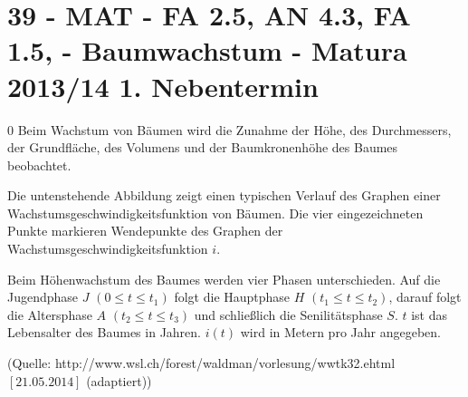 \section{39 - MAT - FA 2.5, AN 4.3, FA 1.5,  - Baumwachstum - Matura 2013/14 1. Nebentermin}

\begin{langesbeispiel} \item[0] %
				Beim Wachstum von Bäumen wird die Zunahme der Höhe, des Durchmessers, der Grundfläche, des Volumens und der Baumkronenhöhe des Baumes beobachtet. 
				
				Die untenstehende Abbildung zeigt einen typischen Verlauf des Graphen einer Wachstumsgeschwindigkeitsfunktion von Bäumen. Die vier eingezeichneten Punkte markieren Wendepunkte des Graphen der Wachstumsgeschwindigkeitsfunktion $i$. 
				
				Beim Höhenwachstum des Baumes werden vier Phasen unterschieden. Auf die Jugendphase $J\,\,(0\leq t \leq t_1)$ folgt die Hauptphase $H\,\,(t_1\leq t\leq t_2)$, darauf folgt die Altersphase $A\,\,(t_2\leq t\leq t_3)$ und schließlich die Senilitätsphase $S$. $t$ ist das Lebensalter des Baumes in Jahren. $i(t)$ wird in Metern pro Jahr angegeben.

				\begin{center}\end{center}
				
				\begin{singlespace}
\begin{tiny}
(Quelle: http://www.wsl.ch/forest/waldman/vorlesung/ww\textunderscore tk32.ehtml $[21.05.2014]$ (adaptiert)) 
\end{tiny}
\end{singlespace}



\end{langesbeispiel}
